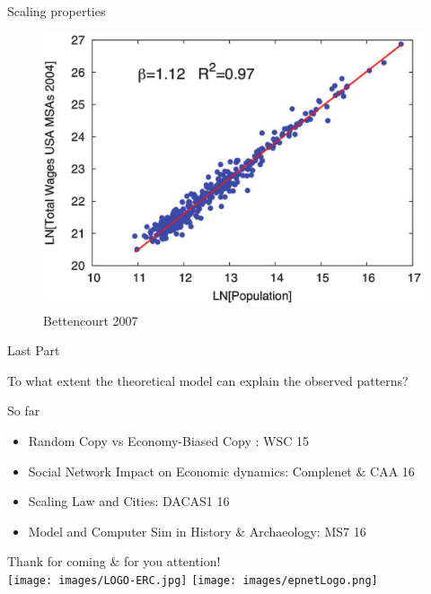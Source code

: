 \documentclass[12pt, notes=show]{beamer}
\begin{document}
\begin{frame}{Scaling properties}
    \begin{figure}
	\includegraphics[width=.8\textwidth]{images/wageVsSize.jpg}
	\caption{ Bettencourt 2007}
    \end{figure}
\end{frame}



\begin{frame}
    \centering
    \Large
  Last Part
\end{frame}

\begin{frame}
 To what extent the theoretical model can explain the observed patterns?
    

\end{frame}

\begin{frame}{So far}
    \small
    \begin{itemize}
	\item Random Copy vs Economy-Biased Copy : WSC 15
	\item Social Network Impact on Economic dynamics: Complenet \& CAA 16
	\item  Scaling Law and Cities: DACAS1 16
	\item  Model and Computer Sim in History \&  Archaeology: MS7 16
    \end{itemize}
    
\end{frame}

\begin{frame}
	\begin{center}
		\Large
    Thank for coming \& for you attention!\\
		\vspace{1cm}
		\texttt{[image: images/LOGO-ERC.jpg]} \hfil	\texttt{[image: images/epnetLogo.png]}\\
	\end{center}


\end{frame}
\end{document}
